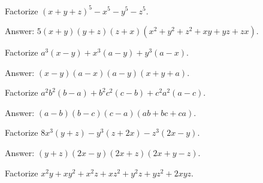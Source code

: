 \documentclass[12pt,a4paper]{memoir}
\theoremstyle{definition}
\begin{document}
\begin{tcolorbox}
	\begin{question}
		Factorize $(x+y+z)^5-x^5-y^5-z^5$.
	\end{question}
\end{tcolorbox}

\begin{solution}[name=Solution by Parviz Shahriari]
	Answer: $5(x+y)(y+z)(z+x)(x^2+y^2+z^2+xy+yz+zx)$.
\end{solution}




\begin{tcolorbox}
	\begin{question}
		Factorize $a^3(x-y) + x^3(a-y) + y^3(a-x)$.
	\end{question}
\end{tcolorbox}

\begin{solution}[name=Solution by Parviz Shahriari]
	Answer: $(x-y)(a-x)(a-y)(x+y+a)$.
\end{solution}


\begin{tcolorbox}
	\begin{question}
		Factorize $a^2b^2(b-a) + b^2c^2(c-b) + c^2a^2(a-c)$.
	\end{question}
\end{tcolorbox}

\begin{solution}[name=Solution by Parviz Shahriari]
	Answer: $(a-b)(b-c)(c-a)(ab+bc+ca)$.
\end{solution}


\begin{tcolorbox}
	\begin{question}
		Factorize $8x^3(y+z)-y^3(z+2x)-z^3(2x-y)$.
	\end{question}
\end{tcolorbox}

\begin{solution}[name=Solution by Parviz Shahriari]
	Answer: $(y+z)(2x-y)(2x+z)(2x+y-z)$.
\end{solution}


\begin{tcolorbox}
	\begin{question}
		Factorize $x^2y+xy^2+x^2z+xz^2+y^2z+yz^2+2xyz$.
	\end{question}
\end{tcolorbox}
\end{document}
